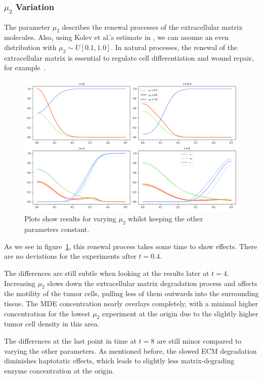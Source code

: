 \subsubsection*{$\mu_2$ Variation}
The parameter $\mu_2$ describes the renewal processes of the extracellular matrix molecules. Also, using Kolev et al.'s estimate in \cite{Kolev2010}, we can assume an even distribution with $\mu_2 \sim U[0.1, 1.0]$. In natural processes, the renewal of the extracellular matrix is essential to regulate cell differentiation and wound repair, for example~\cite{Lu2011-yt}.
\begin{figure}[h]
 \centering
 \includegraphics[width=\textwidth]{resources/images/prolif_mu_2_variation.png}
 \caption{Plots show results for varying $\mu_2$ whilst keeping the other parameters constant.}
 \label{fig:prolif_mu_2_variation}
\end{figure}
As we see in figure~\ref{fig:prolif_mu_2_variation}, this renewal process takes some time to show effects. There are no deviations for the experiments after $t=0.4$.

The differences are still subtle when looking at the results later at $t=4$. Increasing $\mu_2$ slows down the extracellular matrix degradation process and affects the motility of the tumor cells, pulling less of them outwards into the surrounding tissue. The MDE concentration nearly overlays completely, with a minimal higher concentration for the lowest $\mu_2$ experiment at the origin due to the slightly higher tumor cell density in this area.

The differences at the last point in time at $t=8$ are still minor compared to varying the other parameters. As mentioned before, the slowed ECM degradation diminishes haptotatic effects, which leads to slightly less matrix-degrading enzyme concentration at the origin.

